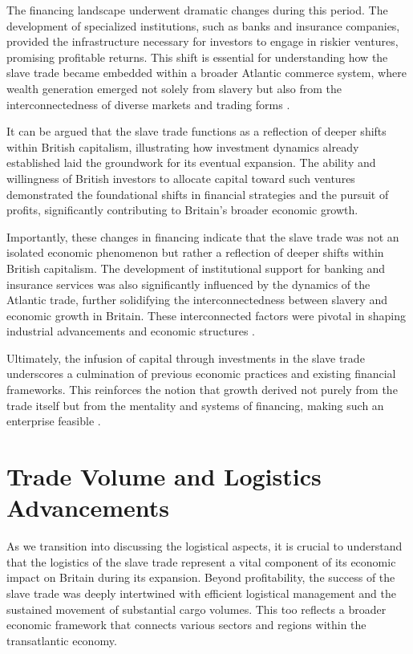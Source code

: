 \documentclass[a4paper,11pt]{article}
\begin{document}
The financing landscape underwent dramatic changes during this period. The development of specialized institutions, such as banks and insurance companies, provided the infrastructure necessary for investors to engage in riskier ventures, promising profitable returns. This shift is essential for understanding how the slave trade became embedded within a broader Atlantic commerce system, where wealth generation emerged not solely from slavery but also from the interconnectedness of diverse markets and trading forms \citep{solow1985}.

It can be argued that the slave trade functions as a reflection of deeper shifts within British capitalism, illustrating how investment dynamics already established laid the groundwork for its eventual expansion. The ability and willingness of British investors to allocate capital toward such ventures demonstrated the foundational shifts in financial strategies and the pursuit of profits, significantly contributing to Britain's broader economic growth.

Importantly, these changes in financing indicate that the slave trade was not an isolated economic phenomenon but rather a reflection of deeper shifts within British capitalism. The development of institutional support for banking and insurance services was also significantly influenced by the dynamics of the Atlantic trade, further solidifying the interconnectedness between slavery and economic growth in Britain. These interconnected factors were pivotal in shaping industrial advancements and economic structures \citep{berghudson2021}.

Ultimately, the infusion of capital through investments in the slave trade underscores a culmination of previous economic practices and existing financial frameworks. This reinforces the notion that growth derived not purely from the trade itself but from the mentality and systems of financing, making such an enterprise feasible \citep{harley2015}.

\section{Trade Volume and Logistics Advancements}

As we transition into discussing the logistical aspects, it is crucial to understand that the logistics of the slave trade represent a vital component of its economic impact on Britain during its expansion. Beyond profitability, the success of the slave trade was deeply intertwined with efficient logistical management and the sustained movement of substantial cargo volumes. This too reflects a broader economic framework that connects various sectors and regions within the transatlantic economy.
\end{document}
